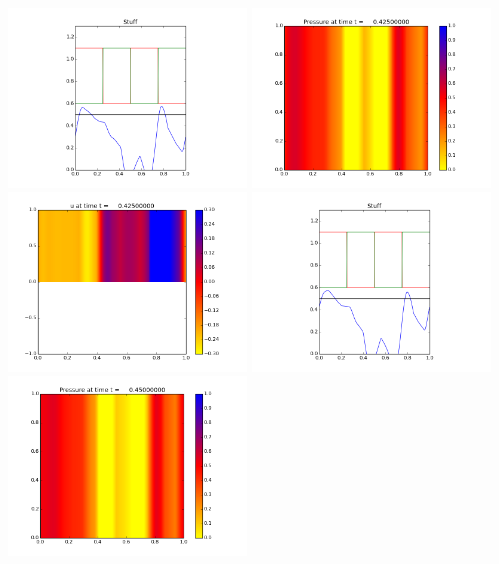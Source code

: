 \documentclass[11pt]{article}
\begin{document}
\vskip 10pt 
\includegraphics[width=0.475\textwidth]{frame0016fig3.png}
\vskip 10pt 
\includegraphics[width=0.475\textwidth]{frame0017fig0.png}
\includegraphics[width=0.475\textwidth]{frame0017fig1.png}
\vskip 10pt 
\includegraphics[width=0.475\textwidth]{frame0017fig3.png}
\vskip 10pt 
\includegraphics[width=0.475\textwidth]{frame0018fig0.png}
\end{document}
